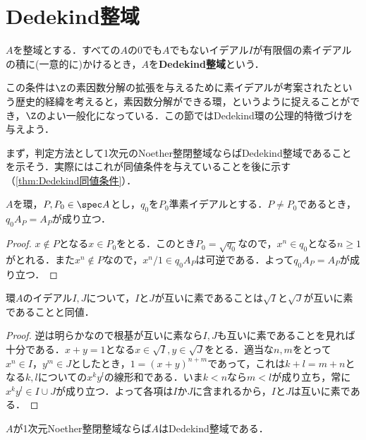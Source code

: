 \section{Dedekind整域}

\begin{defi}[Dedekind整域]
	$A$を整域とする．すべての$A$の0でも$A$でもないイデアル$I$が有限個の素イデアルの積に(一意的に)かけるとき，$A$を\textbf{Dedekind整域}という．
\end{defi}

この条件は$\Z$の素因数分解の拡張を与えるために素イデアルが考案されたという歴史的経緯を考えると，素因数分解ができる環，というように捉えることができ，$\Z$のよい一般化になっている．この節ではDedekind環の公理的特徴づけを与えよう．

まず，判定方法として1次元のNoether整閉整域ならばDedekind整域であることを示そう．実際にはこれが同値条件を与えていることを後に示す（\ref{thm:Dedekind同値条件}）．

\begin{lem}\label{lem:Dedekind-1}
	$A$を環，$P,P_0\in\spec A$とし，$
	q_0$を$P_0$準素イデアルとする．$P\neq P_0$であるとき，$q_0A_P=A_P$が成り立つ．
\end{lem}

\begin{proof}
	$x\not\in P$となる$x\in P_0$をとる．このとき$P_0=\sqrt{q_0}$なので，$x^n\in q_0$となる$n\geq1$がとれる．また$x^n\not\in P$なので，$x^n/1\in q_0A_P$は可逆である．よって$q_0A_P=A_P$が成り立つ．
\end{proof}

\begin{lem}\label{lem:Dedekind-2}
	環$A$のイデアル$I,J$について，$I$と$J$が互いに素であることは$\sqrt{I}$と$\sqrt{J}$が互いに素であることと同値．
\end{lem}

\begin{proof}
	逆は明らかなので根基が互いに素なら$I,J$も互いに素であることを見れば十分である．$x+y=1$となる$x\in\sqrt{I},y\in\sqrt{J}$をとる．適当な$n,m$をとって$x^n\in I，y^m\in J$としたとき，$1=(x+y)^{n+m}$であって，これは$k+l=m+n$となる$k,l$についての$x^ky^l$の線形和である．いま$k<n$なら$m<l$が成り立ち，常に$x^ky^l\in I\cup J$が成り立つ．よって各項は$I$か$J$に含まれるから，$I$と$J$は互いに素である．
\end{proof}

\begin{thm}\label{thm:1dimNoether整閉整域ならDedekind}
	$A$が1次元Noether整閉整域ならば$A$はDedekind整域である．
\end{thm}


